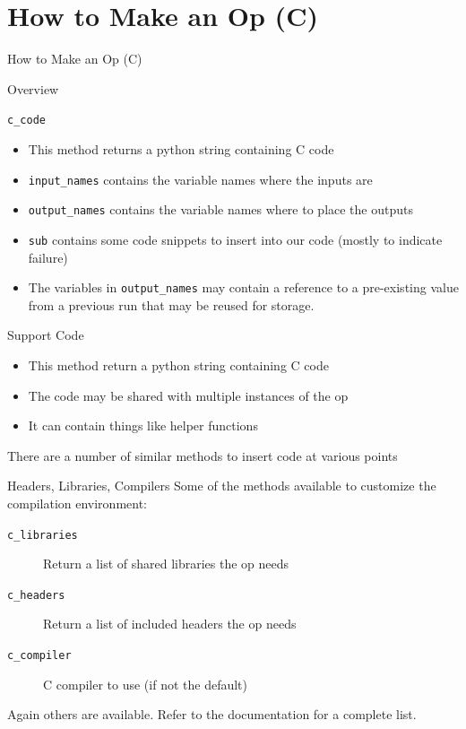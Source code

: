 \documentclass[utf8x]{beamer}
\newcommand{\code}[1]{\lstinline[emph={[2]}]|#1|}
\begin{document}
\section{How to Make an Op (C)}

\begin{frame}[plain]{}
\begin{center}
\Huge How to Make an Op (C)
\end{center}
\end{frame}

\begin{frame}{Overview}

\end{frame}

\begin{frame}{\code{c_code}}

\begin{itemize}
\item This method returns a python string containing C code
\item \code{input_names} contains the variable names where the inputs are
\item \code{output_names} contains the variable names where to place the outputs
\item \code{sub} contains some code snippets to insert into our code (mostly to indicate failure)
\item The variables in \code{output_names} may contain a reference to a pre-existing value from a previous run that may be reused for storage.
\end{itemize}
\end{frame}

\begin{frame}{Support Code}

\begin{itemize}
\item This method return a python string containing C code
\item The code may be shared with multiple instances of the op
\item It can contain things like helper functions
\end{itemize}
There are a number of similar methods to insert code at various points
\end{frame}

\begin{frame}{Headers, Libraries, Compilers}
Some of the methods available to customize the compilation environment:
\begin{description}
\item[\texttt{c\_libraries}] Return a list of shared libraries the op needs
\item[\texttt{c\_headers}] Return a list of included headers the op needs
\item[\texttt{c\_compiler}] C compiler to use (if not the default)
\end{description}
Again others are available.  Refer to the documentation for a complete list.
\end{frame}
\end{document}
